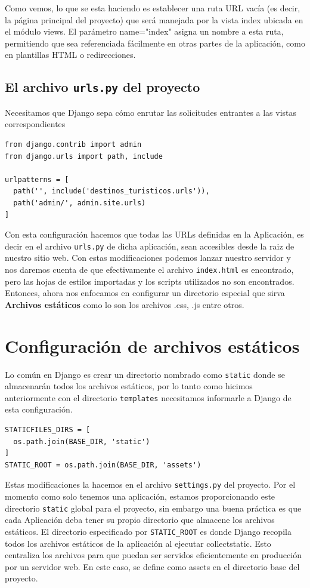 \documentclass[10pt, a4paper]{article}
\newcommand{\mpy}[1]{\texttt{#1}}
\begin{document}
Como vemos, lo que se esta haciendo es establecer una ruta URL vacía (es decir, la página principal del proyecto) que será manejada por la vista index ubicada en el módulo views. El parámetro name="index" asigna un nombre a esta ruta, permitiendo que sea referenciada fácilmente en otras partes de la aplicación, como en plantillas HTML o redirecciones.
\singlespacing

\subsection{El archivo \mpy{urls.py} del proyecto}
Necesitamos que Django sepa cómo enrutar las solicitudes entrantes a las vistas correspondientes

\begin{verbatim}
from django.contrib import admin
from django.urls import path, include

urlpatterns = [
  path('', include('destinos_turisticos.urls')),
  path('admin/', admin.site.urls)
]
\end{verbatim}

Con esta configuración hacemos que todas las URLs definidas en la Aplicación, es decir en el archivo \mpy{urls.py} de dicha aplicación, sean accesibles desde la raiz de nuestro sitio web.
\singlespacing
Con estas modificaciones podemos lanzar nuestro servidor y nos daremos cuenta de que efectivamente el archivo \mpy{index.html} es encontrado, pero las hojas de estilos importadas y los scripts utilizados no son encontrados. 
\singlespacing
Entonces, ahora nos enfocamos en configurar un directorio especial que sirva \textbf{Archivos estáticos} como lo son los archivos .css, .js entre otros.

\section{Configuración de archivos estáticos}
Lo común en Django es crear un directorio nombrado como \mpy{static} donde se almacenarán todos los archivos estáticos, por lo tanto como hicimos anteriormente con el directorio \mpy{templates} necesitamos informarle a Django de esta configuración.

\begin{verbatim}
STATICFILES_DIRS = [
  os.path.join(BASE_DIR, 'static')
]
STATIC_ROOT = os.path.join(BASE_DIR, 'assets')
\end{verbatim}

Estas modificaciones la hacemos en el archivo \mpy{settings.py} del proyecto. Por el momento como solo tenemos una aplicación, estamos proporcionando este directorio \mpy{static} global para el proyecto, sin embargo una buena práctica es que cada Aplicación deba tener su propio directorio que almacene los archivos estáticos.
\singlespacing
El directorio especificado por \mpy{STATIC_ROOT} es donde Django recopila todos los archivos estáticos de la aplicación al ejecutar collectstatic. Esto centraliza los archivos para que puedan ser servidos eficientemente en producción por un servidor web. En este caso, se define como assets en el directorio base del proyecto.
\end{document}

